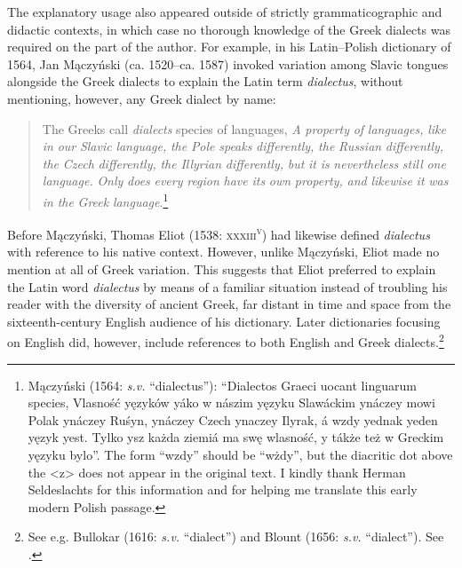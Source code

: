 The explanatory usage also appeared outside of strictly grammaticographic and didactic contexts, in which case no thorough knowledge of the Greek dialects was required on the part of the author. For example, in his Latin–Polish dictionary of 1564, Jan Mączyński (ca. 1520–ca. 1587) invoked variation among Slavic tongues alongside the Greek dialects to explain the Latin term \textit{dialectus}, without mentioning, however, any Greek dialect by name:

\begin{quote}
The Greeks call \textit{dialects} species of languages, \textit{A} \textit{property} \textit{of} \textit{languages,} \textit{like} \textit{in} \textit{our} \textit{Slavic} \textit{language,} \textit{the} \textit{Pole} \textit{speaks} \textit{differently,} \textit{the} \textit{Russian} \textit{differently,} \textit{the} \textit{Czech} \textit{differently,} \textit{the} \textit{Illyrian} \textit{differently,} \textit{but} \textit{it} \textit{is} \textit{nevertheless} \textit{still} \textit{one} \textit{language.} \textit{Only} \textit{does} \textit{every} \textit{region} \textit{have} \textit{its} \textit{own} \textit{property,} \textit{and} \textit{likewise} \textit{it} \textit{was} \textit{in} \textit{the} \textit{Greek} \textit{language}.\footnote{Mączyński (1564: \textit{s.v.} “dialectus”): “Dialectos Graeci uocant linguarum species, Vlasność yęzyków yáko w nászim yęzyku Slawáckim ynáczey mowi Polak ynáczey Ruśyn, ynáczey Czech ynaczey Ilyrak, á wzdy yednak yeden yęzyk yest. Tylko ysz każda ziemiá ma swę wlasność, y tákże też w Greckim yęzyku bylo”. The form “wzdy” should be “wżdy”, but the diacritic dot above the <z> does not appear in the original text. I kindly thank Herman Seldeslachts for this information and for helping me translate this early modern Polish passage.}
\end{quote}

Before Mączyński, Thomas Eliot (1538: \textsc{xxxiii}\textsc{\textsuperscript{v}}) had likewise defined \textit{dialectus} with reference to his native context. However, unlike Mączyński, Eliot made no mention at all of Greek variation. This suggests that Eliot preferred to explain the Latin word \textit{dialectus} by means of a familiar situation instead of troubling his reader with the diversity of ancient Greek, far distant in time and space from the sixteenth-century English audience of his dictionary. Later dictionaries focusing on English did, however, include references to both English and Greek dialects.\footnote{See e.g. Bullokar (1616: \textit{s.v.} “dialect”) and Blount (1656: \textit{s.v.} “dialect”). See \citet[7]{Blank1996}.}

